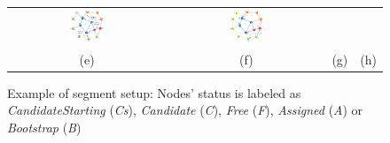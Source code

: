 \begin{figure}
\begin{tabular}{cccc}
\includegraphics[width=0.23\textwidth]{pictures/seq07.eps} & 
\includegraphics[width=0.23\textwidth]{pictures/seq08.eps} \\
(e) & (f) & (g) & (h) \\
\end{tabular}
\caption{Example of \disr{} segment setup: Nodes' status is labeled as \emph{CandidateStarting} (\emph{Cs}), \emph{Candidate} (\emph{C}), \emph{Free} (\emph{F}), \emph{Assigned} (\emph{A}) or \emph{Bootstrap} (\emph{B})}
\label{fig:disr_events}
\end{figure}

